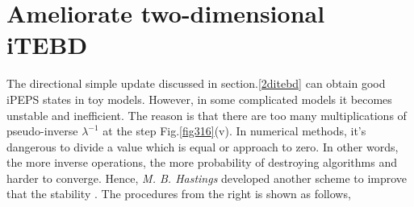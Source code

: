 \section{Ameliorate two-dimensional iTEBD}
\label{2dhastin}

The directional simple update discussed in section.\ref{2ditebd} can obtain good iPEPS states in toy models. However, in some complicated models it becomes unstable and inefficient. The reason is that there are too many multiplications of pseudo-inverse $\lambda^{-1}$ at the step Fig.\ref{fig316}(v). In numerical methods, it's dangerous to divide a value which is equal or approach to zero. In other words, the more inverse operations, the more probability of destroying algorithms and harder to converge. Hence, \textit{M. B. Hastings} developed another scheme to improve that the stability \cite{light_hastings}. The procedures from the right is shown as follows,

